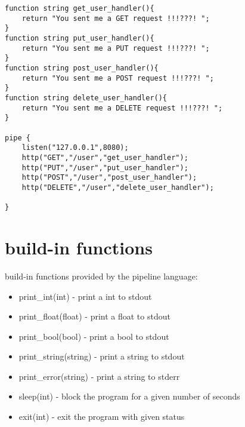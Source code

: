 \documentclass[./Report_main.tex]{subfiles}
\begin{document}
\begin{lstlisting}
function string get_user_handler(){
    return "You sent me a GET request !!!???! ";
}
function string put_user_handler(){
    return "You sent me a PUT request !!!???! ";
}
function string post_user_handler(){
    return "You sent me a POST request !!!???! ";
}
function string delete_user_handler(){
    return "You sent me a DELETE request !!!???! ";
}

pipe {
    listen("127.0.0.1",8080);
    http("GET","/user","get_user_handler");
    http("PUT","/user","put_user_handler");
    http("POST","/user","post_user_handler");
    http("DELETE","/user","delete_user_handler");

}
\end{lstlisting}

\section{build-in functions}
build-in functions provided by the pipeline language:\\
\begin{itemize}
    \item print\_int(int) - print a int to stdout
    \item print\_float(float) - print a float to stdout
    \item print\_bool(bool) - print a bool to stdout
    \item print\_string(string) - print a string to stdout
    \item print\_error(string) - print a string to stderr
    \item sleep(int) - block the program for a given number of seconds
    \item exit(int) - exit the program with given status
\end{itemize}
\end{document}

